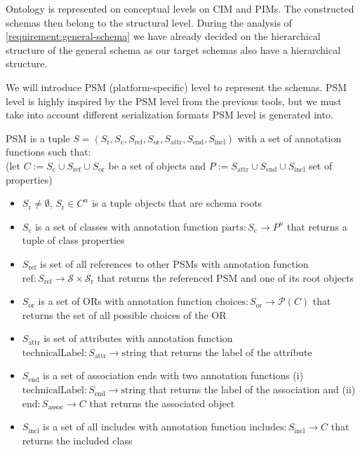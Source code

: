 Ontology is represented on conceptual levels on CIM and PIMs. The constructed schemas then belong to the structural level. During the analysis of \autoref{requirement:general-schema} we have already decided on the hierarchical structure of the general schema as our target schemas also have a hierarchical structure.

We will introduce PSM (platform-specific) level to represent the schemas. PSM level is highly inspired by the PSM level from the previous tools, but we must take into account different serialization formats PSM level is generated into.

\begin{definition}[PSM]
    PSM is a tuple $S=(S_{\textrm{r}}, S_{\textrm{c}}, S_{\textrm{ref}}, S_{\textrm{or}}, S_{\textrm{attr}}, S_{\textrm{end}}, S_{\textrm{incl}})$ with a set of annotation functions such that:
    \\(let $C:=S_{\textrm{c}}\cup S_{\textrm{ref}}\cup S_{\textrm{or}}$ be a set of objects and $P:=S_{\textrm{attr}}\cup S_{\textrm{end}}\cup S_{\textrm{incl}}$ set of properties)
    \begin{itemize}
        \item $S_{\textrm{r}} \neq \emptyset$, $S_{\textrm{r}} \in C^n$ is a tuple objects that are schema roots

        \item $S_{\textrm{c}}$ is a set of classes with annotation function $\textrm{parts}: S_{\textrm{c}} \rightarrow P^n$ that returns a tuple of class properties

        \item $S_{\textrm{ref}}$ is set of all references to other PSMs with annotation function $\textrm{ref}: S_{\textrm{ref}} \rightarrow \mathcal{S} \times \mathcal{S}_{\textrm{r}}$ that returns the referenced PSM and one of its root objects

        \item $S_{\textrm{or}}$ is a set of ORs with annotation function $\textrm{choices}: S_{\textrm{or}} \rightarrow \mathcal{P}(C)$ that returns the set of all possible choices of the OR

        \item $S_{\textrm{attr}}$ is set of attributes with annotation function $\textrm{technicalLabel}: S_{\textrm{attr}} \rightarrow \textrm{string}$ that returns the label of the attribute

        \item $S_{\textrm{end}}$ is a set of association ends with two annotation functions (i)\\$\textrm{technicalLabel}: S_{\textrm{end}} \rightarrow \textrm{string}$ that returns the label of the association and (ii) $\textrm{end}: S_{\textrm{assoc}} \rightarrow C$ that returns the associated object

        \item $S_{\textrm{incl}}$ is a set of all includes with annotation function $\textrm{includes}: S_{\textrm{incl}} \rightarrow C$ that returns the included class
    \end{itemize}
\end{definition}

